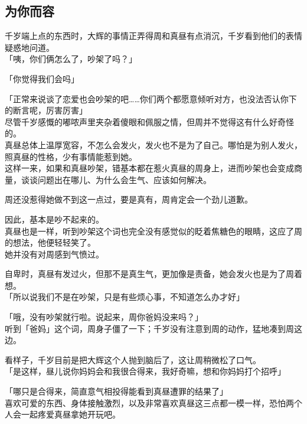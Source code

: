 \subsection{为你而容}

千岁端上点的东西时，大辉的事情正弄得周和真昼有点消沉，千岁看到他们的表情疑惑地问道。\\

「咦，你们俩怎么了，吵架了吗？」

「你觉得我们会吗」

「正常来说谈了恋爱也会吵架的吧……你们两个都愿意倾听对方，也没法否认你下的断言呢，厉害厉害」\\

尽管千岁感慨的嘟哝声里夹杂着傻眼和佩服之情，但周并不觉得这有什么好奇怪的。\\

真昼总体上温厚宽容，不怎么会发火，发火也不是为了自己。哪怕是为别人发火，照真昼的性格，少有事情能惹到她。\\

这样一来，如果和真昼吵架，错基本都在惹火真昼的周身上，进而吵架也会变成商量，谈谈问题出在哪儿、为什么会生气、应该如何解决。

周还没惹得她做不到这一点过，要是真有，周肯定会一个劲儿道歉。

因此，基本是吵不起来的。\\

真昼也是一样，听到吵架这个词也完全没有感觉似的眨着焦糖色的眼睛，这应了周的想法，他便轻轻笑了。\\

她并没有对周感到气愤过。

自卑时，真昼有发过火，但那不是真生气，更加像是责备，她会发火也是为了周着想。\\

「所以说我们不是在吵架，只是有些烦心事，不知道怎么办才好」

「哦，没有吵架就行啦。说起来，周你爸妈没来吗？」\\

听到「爸妈」这个词，周身子僵了一下；千岁没有注意到周的动作，猛地凑到周这边。

看样子，千岁目前是把大辉这个人抛到脑后了，这让周稍微松了口气。\\

「是这样，昼儿说你妈妈会和我很合得来，我好奇嘛，想和你妈妈打个招呼」

「哪只是合得来，简直意气相投得能看到真昼遭罪的结果了」\\

喜欢可爱的东西、身体接触激烈，以及非常喜欢真昼这三点都一模一样，恐怕两个人会一起疼爱真昼拿她开玩吧。

